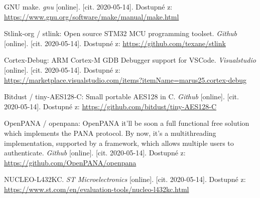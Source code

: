 \begin{thebibliography}{9}
GNU make. \textit{gnu} [online]. [cit. 2020-05-14]. Dostupné z: 
\url{
https://www.gnu.org/software/make/manual/make.html
}

Stlink-org / stlink: Open source STM32 MCU programming toolset. 
\textit{ Github } 
[online]. [cit. 2020-05-14]. Dostupné z:
\url{
https://github.com/texane/stlink
}



Cortex-Debug: ARM Cortex-M GDB Debugger support for VSCode. \textit{ Visualstudio } [online]. [cit. 2020-05-14]. Dostupné z: 
\url{
https://marketplace.visualstudio.com/items?itemName=marus25.cortex-debug
}


Bitdust / tiny-AES128-C: Small portable AES128 in C. \textit{Github}
[online]. [cit. 2020-05-14]. Dostupné z: 
\url{
https://github.com/bitdust/tiny-AES128-C
}

OpenPANA / openpana: OpenPANA it'll be soon a full functional free solution which implements the PANA protocol. By now, it's a multithreading implementation, supported by a framework, which allows multiple users to authenticate. 
\textit{ Github }
[online]. [cit. 2020-05-14]. Dostupné z: 
\url{
https://github.com/OpenPANA/openpana
}


NUCLEO-L432KC.
\textit{
ST Microelectronics
}
[online]. [cit. 2020-05-14]. Dostupné z: 
\url{
https://www.st.com/en/evaluation-tools/nucleo-l432kc.html
}


























%  


\end{thebibliography}
